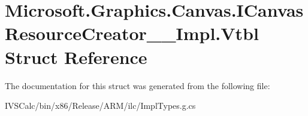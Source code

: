 \hypertarget{struct_microsoft_1_1_graphics_1_1_canvas_1_1_i_canvas_resource_creator_____impl_1_1_vtbl}{}\section{Microsoft.\+Graphics.\+Canvas.\+I\+Canvas\+Resource\+Creator\+\_\+\+\_\+\+Impl.\+Vtbl Struct Reference}
\label{struct_microsoft_1_1_graphics_1_1_canvas_1_1_i_canvas_resource_creator_____impl_1_1_vtbl}


The documentation for this struct was generated from the following file\+:\begin{DoxyCompactItemize}
\item 
I\+V\+S\+Calc/bin/x86/\+Release/\+A\+R\+M/ilc/Impl\+Types.\+g.\+cs\end{DoxyCompactItemize}
